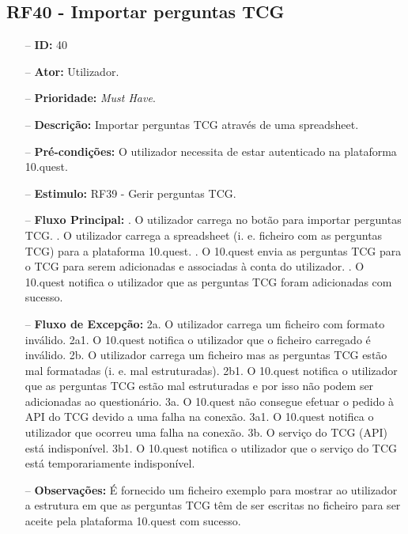 \subsection{RF40 - Importar perguntas TCG}
\begin{itemize}
	\item[--] \textbf{ID:} 40
	\item[--]  \textbf{Ator:} Utilizador.
	\item[--]  \textbf{Prioridade:} \textit{Must Have}.
	\item[--]  \textbf{Descrição:} Importar perguntas TCG através de uma spreadsheet. 
	\item[--]  \textbf{Pré-condições:} O utilizador necessita de estar autenticado na plataforma 10.quest.
	\item[--]  \textbf{Estimulo:}  RF39 - Gerir perguntas TCG.
	\item[--]  \textbf{Fluxo Principal:} 
		. O utilizador carrega no botão para importar perguntas TCG.
		. O utilizador carrega a spreadsheet (i. e. ficheiro com as perguntas TCG) para a plataforma 10.quest.
		. O 10.quest envia as perguntas TCG para o TCG para serem adicionadas e associadas à conta do utilizador.
		. O 10.quest notifica o utilizador que as perguntas TCG foram adicionadas com sucesso.
	\item[--]  \textbf{Fluxo de Excepção:} 
		\subitem 2a. O utilizador carrega um ficheiro com formato inválido.
		\subitem 2a1. O 10.quest notifica o utilizador que o ficheiro carregado é inválido.
		\subitem 2b. O utilizador carrega um ficheiro mas as perguntas TCG estão mal formatadas (i. e. mal estruturadas).
		\subitem 2b1. O 10.quest notifica o utilizador que as perguntas TCG  estão mal estruturadas e por isso não podem ser adicionadas ao questionário.
		\subitem 3a. O 10.quest não consegue efetuar o pedido à API do TCG devido a uma falha na conexão.
		\subitem 3a1. O 10.quest notifica o utilizador que ocorreu uma falha na conexão.
		\subitem 3b. O serviço do TCG (API) está indisponível.
		\subitem 3b1. O 10.quest notifica o utilizador que o serviço do TCG está temporariamente indisponível. 
	\item[--]  \textbf{Observações:} É fornecido um ficheiro exemplo para mostrar ao utilizador a estrutura em que as perguntas TCG  têm de ser escritas no ficheiro para ser aceite pela plataforma 10.quest com sucesso.
\end{itemize}
\newpage

